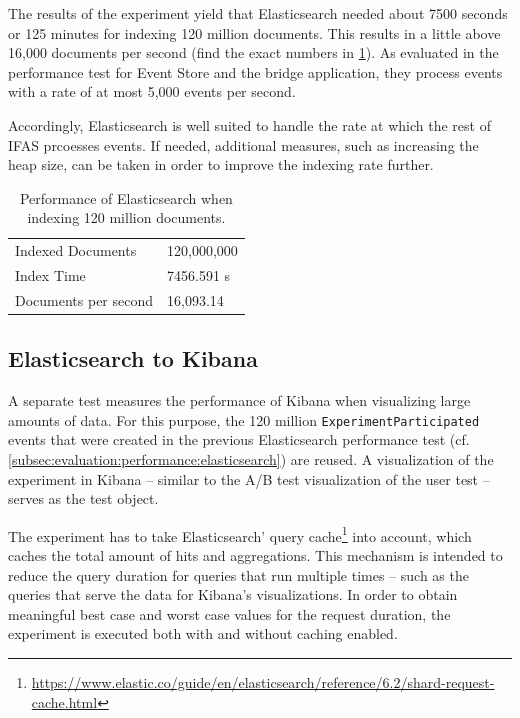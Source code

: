The results of the experiment yield that Elasticsearch needed about 7500 seconds or 125 minutes for indexing 120 million documents.
This results in a little above 16,000 documents per second (find the exact numbers in \cref{table:elasticsearch-performance}).
As evaluated in the performance test for Event Store and the bridge application, they process events with a rate of at most 5,000 events per second.

Accordingly, Elasticsearch is well suited to handle the rate at which the rest of \ac{IFAS} prcoesses events.
If needed, additional measures, such as increasing the heap size, can be taken in order to improve the indexing rate further.

\begin{table}
\caption{Performance of Elasticsearch when indexing 120 million documents.}
\label{table:elasticsearch-performance}
\centering
\begin{tabular}{ll}
Indexed Documents & 120,000,000 \\
Index Time & 7456.591 s \\
Documents per second & 16,093.14
\end{tabular}
\end{table}

\subsection{Elasticsearch to Kibana}
\label{subsec:evaluation:performance:kibana}

A separate test measures the performance of Kibana when visualizing large amounts of data.
For this purpose, the 120 million \texttt{ExperimentParticipated} events that were created in the previous Elasticsearch performance test (cf. \cref{subsec:evaluation:performance:elasticsearch}) are reused.
A visualization of the experiment in Kibana -- similar to the A/B test visualization of the user test -- serves as the test object.


The experiment has to take Elasticsearch' query cache\footnote{\url{https://www.elastic.co/guide/en/elasticsearch/reference/6.2/shard-request-cache.html}} into account, which caches the total amount of hits and aggregations.
This mechanism is intended to reduce the query duration for queries that run multiple times -- such as the queries that serve the data for Kibana's visualizations.
In order to obtain meaningful best case and worst case values for the request duration, the experiment is executed both with and without caching enabled.

